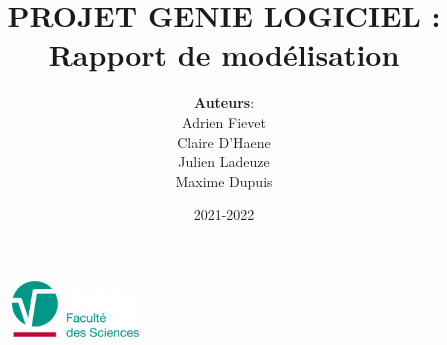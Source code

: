 \documentclass{article}
\title{PROJET GENIE LOGICIEL :\\ Rapport de modélisation}
\author{\textbf{Auteurs}: \\ Adrien Fievet \\ Claire D'Haene \\ Julien Ladeuze \\ Maxime Dupuis}
\date{2021-2022}
\begin{document}
\maketitle

\begin{figure}
    \centering
    \includegraphics[width = 0.3\textwidth]{images/facSciences.png}
\end{figure}

\thispagestyle{empty}
\end{document}
